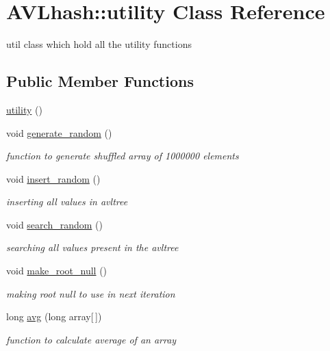 \hypertarget{class_a_v_lhash_1_1utility}{\section{A\-V\-Lhash\-:\-:utility Class Reference}
\label{class_a_v_lhash_1_1utility}
}


util class which hold all the utility functions  


\subsection*{Public Member Functions}
\begin{DoxyCompactItemize}
\item 
\hyperlink{class_a_v_lhash_1_1utility_ab887dfbea4ebc6dde478d778c11bcf1c}{utility} ()
\item 
void \hyperlink{class_a_v_lhash_1_1utility_a95ab1899db5d99702b94a24696636f64}{generate\-\_\-random} ()
\begin{DoxyCompactList}\small\item\em function to generate shuffled array of 1000000 elements \end{DoxyCompactList}\item 
void \hyperlink{class_a_v_lhash_1_1utility_aefd252eb88e1f7522ec70dc4f0332327}{insert\-\_\-random} ()
\begin{DoxyCompactList}\small\item\em inserting all values in avltree \end{DoxyCompactList}\item 
void \hyperlink{class_a_v_lhash_1_1utility_afe0f9aaa2c4dc03fa4bc97da376be1a1}{search\-\_\-random} ()
\begin{DoxyCompactList}\small\item\em searching all values present in the avltree \end{DoxyCompactList}\item 
void \hyperlink{class_a_v_lhash_1_1utility_a6fe051b87690e300eb5d5d2ab0280fad}{make\-\_\-root\-\_\-null} ()
\begin{DoxyCompactList}\small\item\em making root null to use in next iteration \end{DoxyCompactList}\item 
long \hyperlink{class_a_v_lhash_1_1utility_ae412503aba3f53f45c4a418f509c19fe}{avg} (long array\mbox{[}$\,$\mbox{]})
\begin{DoxyCompactList}\small\item\em function to calculate average of an array \end{DoxyCompactList}\item 

\end{DoxyCompactItemize}
